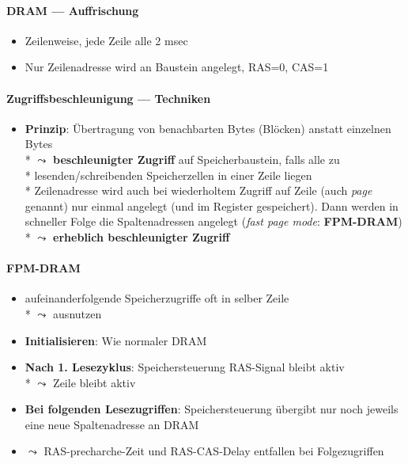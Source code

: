 \paragraph{DRAM --- Auffrischung}
\begin{itemize}
	\item Zeilenweise, jede Zeile alle 2 msec
	\item Nur Zeilenadresse wird an Baustein angelegt, RAS=0, CAS=1
\end{itemize}

\paragraph{Zugriffsbeschleunigung --- Techniken}
\begin{itemize}
	\item \textbf{Prinzip}: Übertragung von benachbarten Bytes (Blöcken) anstatt einzelnen Bytes \\*
		\( \leadsto \) \textbf{beschleunigter Zugriff} auf Speicherbaustein, falls alle zu \\* \phantom{\( \leadsto \)} lesenden/schreibenden Speicherzellen in einer Zeile liegen \\*
		Zeilenadresse wird auch bei wiederholtem Zugriff auf Zeile (auch \emph{page} genannt) nur einmal angelegt (und im Register gespeichert). Dann werden in schneller Folge die Spaltenadressen angelegt (\emph{fast page mode}: \textbf{FPM-DRAM}) \\*
		\( \leadsto \) \textbf{erheblich beschleunigter Zugriff}
\end{itemize}

\paragraph{FPM-DRAM}
\begin{itemize}
	\item aufeinanderfolgende Speicherzugriffe oft in selber Zeile \\*
		 \( \leadsto \) ausnutzen
	\item \textbf{Initialisieren}: Wie normaler DRAM
	\item \textbf{Nach 1. Lesezyklus}: Speichersteuerung RAS-Signal bleibt aktiv \\*
		\( \leadsto \) Zeile bleibt aktiv
	\item \textbf{Bei folgenden Lesezugriffen}: Speichersteuerung übergibt nur noch jeweils eine neue Spaltenadresse an DRAM
	\item \( \leadsto \) RAS-precharche-Zeit und RAS-CAS-Delay entfallen bei Folgezugriffen
\end{itemize}

